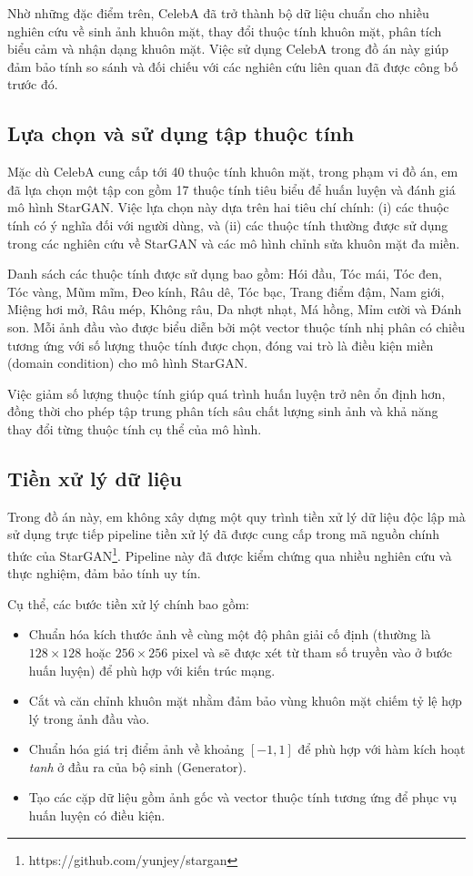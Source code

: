 \documentclass[../DoAn.tex]{subfiles}
\begin{document}
Nhờ những đặc điểm trên, CelebA đã trở thành bộ dữ liệu chuẩn cho nhiều nghiên cứu về sinh ảnh khuôn mặt, thay đổi thuộc tính khuôn mặt, phân tích biểu cảm và nhận dạng khuôn mặt. Việc sử dụng CelebA trong đồ án này giúp đảm bảo tính so sánh và đối chiếu với các nghiên cứu liên quan đã được công bố trước đó.

\subsection{Lựa chọn và sử dụng tập thuộc tính}

Mặc dù CelebA cung cấp tới 40 thuộc tính khuôn mặt, trong phạm vi đồ án, em đã lựa chọn một tập con gồm 17 thuộc tính tiêu biểu để huấn luyện và đánh giá mô hình StarGAN. Việc lựa chọn này dựa trên hai tiêu chí chính: (i) các thuộc tính có ý nghĩa đối với người dùng, và (ii) các thuộc tính thường được sử dụng trong các nghiên cứu về StarGAN và các mô hình chỉnh sửa khuôn mặt đa miền.

Danh sách các thuộc tính được sử dụng bao gồm: Hói đầu, Tóc mái, Tóc đen, Tóc vàng, Mũm mĩm, Đeo kính, Râu dê, Tóc bạc, Trang điểm đậm, Nam giới, Miệng hơi mở, Râu mép, Không râu, Da nhợt nhạt, Má hồng, Mỉm cười và Đánh son. Mỗi ảnh đầu vào được biểu diễn bởi một vector thuộc tính nhị phân có chiều tương ứng với số lượng thuộc tính được chọn, đóng vai trò là điều kiện miền (domain condition) cho mô hình StarGAN.

Việc giảm số lượng thuộc tính giúp quá trình huấn luyện trở nên ổn định hơn, đồng thời cho phép tập trung phân tích sâu chất lượng sinh ảnh và khả năng thay đổi từng thuộc tính cụ thể của mô hình.

\subsection{Tiền xử lý dữ liệu}

Trong đồ án này, em không xây dựng một quy trình tiền xử lý dữ liệu độc lập mà sử dụng trực tiếp pipeline tiền xử lý đã được cung cấp trong mã nguồn chính thức của StarGAN\footnote{https://github.com/yunjey/stargan}. Pipeline này đã được kiểm chứng qua nhiều nghiên cứu và thực nghiệm, đảm bảo tính uy tín.

Cụ thể, các bước tiền xử lý chính bao gồm:
\begin{itemize}
    \item Chuẩn hóa kích thước ảnh về cùng một độ phân giải cố định (thường là $128 \times 128$ hoặc $256 \times 256$ pixel và sẽ được xét từ tham số truyền vào ở bước huấn luyện) để phù hợp với kiến trúc mạng.
    \item Cắt và căn chỉnh khuôn mặt nhằm đảm bảo vùng khuôn mặt chiếm tỷ lệ hợp lý trong ảnh đầu vào.
    \item Chuẩn hóa giá trị điểm ảnh về khoảng $[-1, 1]$ để phù hợp với hàm kích hoạt \textit{tanh} ở đầu ra của bộ sinh (Generator).
    \item Tạo các cặp dữ liệu gồm ảnh gốc và vector thuộc tính tương ứng để phục vụ huấn luyện có điều kiện.
\end{itemize}
\end{document}
